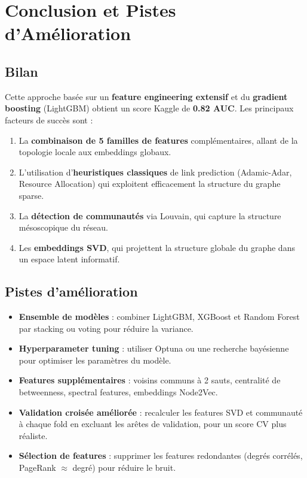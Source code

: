 \documentclass[12pt,a4paper]{article}
\begin{document}
\section{Conclusion et Pistes d'Amélioration}

\subsection{Bilan}

Cette approche basée sur un \textbf{feature engineering extensif} et du \textbf{gradient boosting} (LightGBM) obtient un score Kaggle de \textbf{0.82 AUC}. Les principaux facteurs de succès sont :

\begin{enumerate}
    \item La \textbf{combinaison de 5 familles de features} complémentaires, allant de la topologie locale aux embeddings globaux.
    \item L'utilisation d'\textbf{heuristiques classiques} de link prediction (Adamic-Adar, Resource Allocation) qui exploitent efficacement la structure du graphe sparse.
    \item La \textbf{détection de communautés} via Louvain, qui capture la structure mésoscopique du réseau.
    \item Les \textbf{embeddings SVD}, qui projettent la structure globale du graphe dans un espace latent informatif.
\end{enumerate}

\subsection{Pistes d'amélioration}

\begin{itemize}
    \item \textbf{Ensemble de modèles} : combiner LightGBM, XGBoost et Random Forest par stacking ou voting pour réduire la variance.
    \item \textbf{Hyperparameter tuning} : utiliser Optuna ou une recherche bayésienne pour optimiser les paramètres du modèle.
    \item \textbf{Features supplémentaires} : voisins communs à 2 sauts, centralité de betweenness, spectral features, embeddings Node2Vec.
    \item \textbf{Validation croisée améliorée} : recalculer les features SVD et communauté à chaque fold en excluant les arêtes de validation, pour un score CV plus réaliste.
    \item \textbf{Sélection de features} : supprimer les features redondantes (degrés corrélés, PageRank $\approx$ degré) pour réduire le bruit.
\end{itemize}
\end{document}
